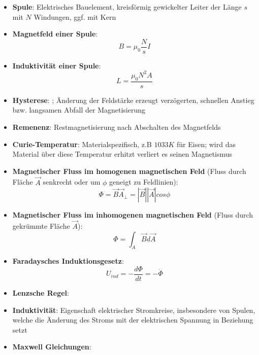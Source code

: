 \begin{itemize}
	\item \textbf{Spule}: Elektrisches Bauelement, kreisförmig gewickelter Leiter der Länge $s$ mit $N$ Windungen, ggf. mit Kern
	\item \textbf{Magnetfeld einer Spule}:
	\begin{equation}
		B = \mu_0\frac{N}{s}I
	\end{equation}
	\item \textbf{Induktivität einer Spule}:
	\begin{equation}
		L = \frac{\mu_0N^2A}{s}
	\end{equation}
	\item \textbf{Hysterese}: ; Änderung der Feldstärke erzeugt verzögerten, schnellen Anstieg bzw. langsamen Abfall der Magnetisierung
	\item \textbf{Remenenz}: Restmagnetisierung nach Abschalten des Magnetfelds
	\item \textbf{Curie-Temperatur}: Materialspezifisch, z.B $1033K$ für Eisen; wird das Material über diese Temperatur erhitzt verliert es seinen Magnetismus
	\item \textbf{Magnetischer Fluss im homogenen magnetischen Feld} (Fluss durch Fläche $\vec{A}$ senkrecht oder um $\phi$ geneigt zu Feldlinien):
	\begin{equation}
		\Phi = \vec{B}\vec{A}_\perp = |\vec{B}||\vec{A}|cos\phi
	\end{equation}
	\item \textbf{Magnetischer Fluss im inhomogenen magnetischen Feld} (Fluss durch gekrümmte Fläche $\vec{A}$):
	\begin{equation}
		\Phi = \int_A \vec{B}d\vec{A}
	\end{equation}
	\item \textbf{Faradaysches Induktionsgesetz}:
	\begin{equation}
		U_{ind} = -\frac{d\Phi}{dt} = -\dot{\Phi}
	\end{equation}
	\item \textbf{Lenzsche Regel}: 
	\item \textbf{Induktivität}: Eigenschaft elektrischer Stromkreise, insbesondere von Spulen, welche die Änderung des Stroms mit der elektrischen Spannung in Beziehung setzt
	\item \textbf{Maxwell Gleichungen}:
	\begin{align*}

\end{align*}
\end{itemize}
